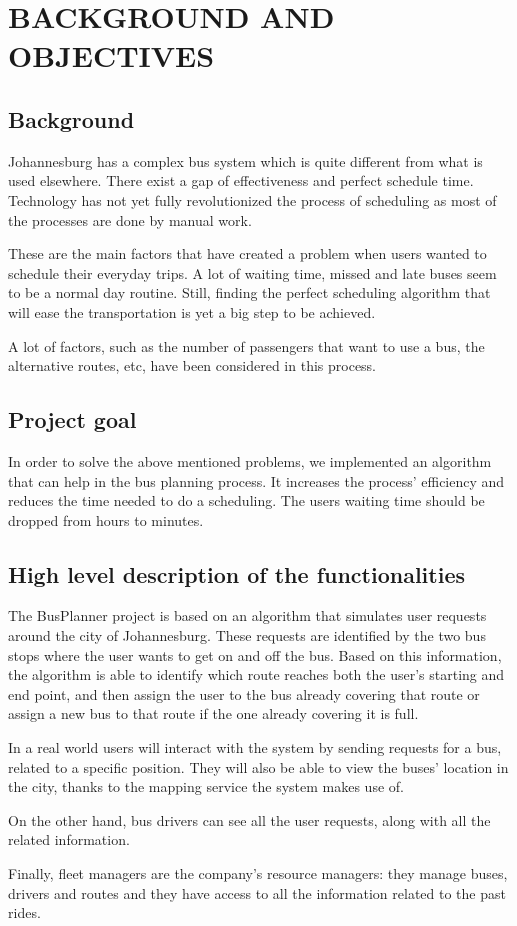 \section{BACKGROUND AND OBJECTIVES}

\subsection{Background}
Johannesburg has a complex bus system which is quite different from what is used elsewhere. There exist a gap of effectiveness and perfect schedule time. Technology has not yet fully revolutionized the process of scheduling as most of the processes are done by manual work. 

These are the main factors that have created a problem when users wanted to schedule their everyday trips. A lot of waiting time, missed and late buses seem to be a normal day routine. Still, finding the perfect scheduling algorithm that will ease the transportation is yet a big step to be achieved. 

A lot of factors, such as the number of passengers that want to use a bus, the alternative routes, etc, have been considered in this process. 

\subsection{Project goal}
In order to solve the above mentioned problems, we implemented an algorithm that can help in the bus planning process. It increases the process' efficiency and reduces the time needed to do a scheduling. The users waiting time should be dropped from hours to minutes.

\subsection{High level description of the functionalities}
The BusPlanner project is based on an algorithm that simulates user requests around the city of Johannesburg. These requests are identified by the two bus stops where the user wants to get on and off the bus. Based on this information, the algorithm is able to identify which route reaches both the user's starting and end point, and then assign the user to the bus already covering that route or assign a new bus to that route if the one already covering it is full.

In a real world users will interact with the system by sending requests for a bus, related to a specific position. They will also be able to view the buses' location in the city, thanks to the mapping service the system makes use of.

On the other hand, bus drivers can see all the user requests, along with all the related information. 

Finally, fleet managers are the company's resource managers: they manage buses, drivers and routes and they have access to all the information related to the past rides.